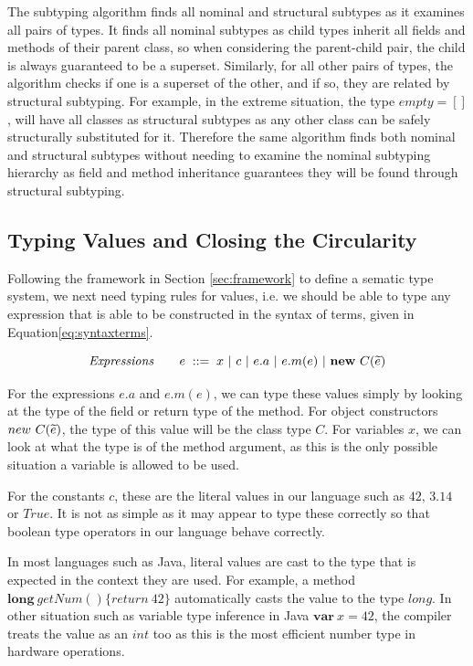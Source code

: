 \documentclass{l4proj}
\begin{document}
The subtyping algorithm finds all nominal and structural subtypes as it examines all pairs of types.
It finds all nominal subtypes as child types inherit all fields and methods of their parent class, so when considering the parent-child pair, the child is always guaranteed to be a superset.
Similarly, for all other pairs of types, the algorithm checks if one is a superset of the other, and if so, they are related by structural subtyping.
For example, in the extreme situation, the type $empty = []$, will have all classes as structural subtypes as any other class can be safely structurally substituted for it.
Therefore the same algorithm finds both nominal and structural subtypes without needing to examine the nominal subtyping hierarchy as field and method inheritance guarantees they will be found through structural subtyping.

\subsection{Typing Values and Closing the Circularity}
\label{numtypes}

Following the framework in Section \ref{sec:framework} to define a sematic type system, we next need typing rules for values, i.e. we should be able to type any expression that is able to be constructed in the syntax of terms, given in Equation\ref{eq:syntaxterms}.

\begin{equation}
    \mbox{\textit{Expressions}}        \qquad e  \; ::=\;   x\ |\  c\ |\ e.a\ |\ e.m(e) \ | \ \mathbf{new}\  C(\widetilde{e})
\end{equation}

For the expressions $e.a$ and $e.m(e)$, we can type these values simply by looking at the type of the field or return type of the method.
For object constructors $new\ C(\widetilde{e})$, the type of this value will be the class type $C$.
For variables $x$, we can look at what the type is of the method argument, as this is the only possible situation a variable is allowed to be used.

For the constants $c$, these are the literal values in our language such as $42$, $3.14$ or $True$.
It is not as simple as it may appear to type these correctly so that boolean type operators in our language behave correctly.

In most languages such as Java, literal values are cast to the type that is expected in the context they are used.
For example, a method $\textbf{long}\ getNum()\{return\ 42\}$ automatically casts the value to the type $long$.
In other situation such as variable type inference in Java $\textbf{var}\ x = 42$, the compiler treats the value as an $int$ too as this is the most efficient number type in hardware operations.
\end{document}
